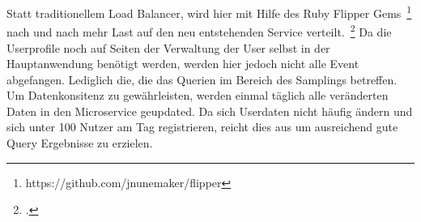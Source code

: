 Statt traditionellem Load Balancer, wird hier mit Hilfe des Ruby Flipper Gems~\footnote{https://github.com/jnunemaker/flipper} nach und nach mehr Last auf den neu entstehenden Service verteilt.~\footcite[vgl.][]{Hammant:Strangler}
Da die Userprofile noch auf Seiten der Verwaltung der User selbst in der Hauptanwendung benötigt werden, werden hier jedoch nicht alle Event abgefangen. Lediglich die, die das Querien im Bereich des Samplings betreffen. Um Datenkonsitenz zu gewährleisten, werden einmal täglich alle veränderten Daten in den Microservice geupdated. Da sich Userdaten nicht häufig ändern und sich unter 100 Nutzer am Tag registrieren, reicht dies aus um ausreichend gute Query Ergebnisse zu erzielen.